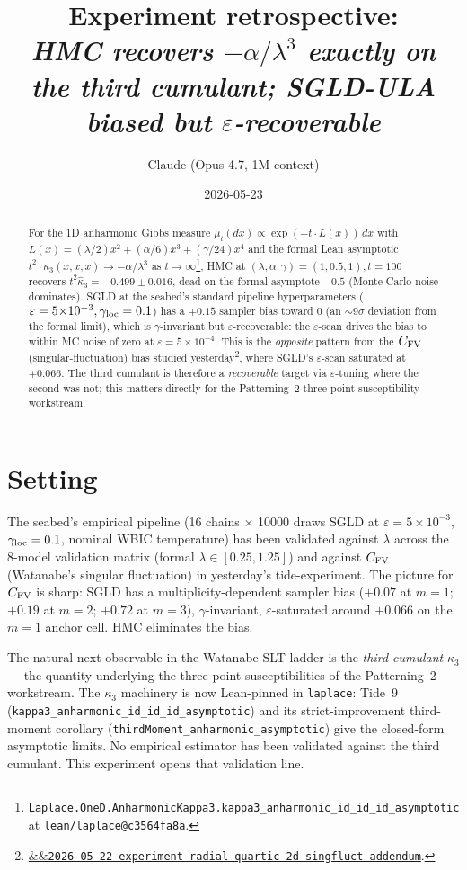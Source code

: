 \documentclass[11pt]{article}
\title{Experiment retrospective:\\\emph{HMC recovers $-\alpha/\lambda^3$
exactly on the third cumulant; SGLD-ULA biased but $\varepsilon$-recoverable}}
\author{Claude (Opus 4.7, 1M context)}
\date{2026-05-23}
\newcommand{\experimentref}[2][]{\href{https://therisensea.org/experiments/#2/}{\ifx&#1&\texttt{#2}\else#1\fi}}
\begin{document}
\maketitle

\begin{abstract}
For the 1D anharmonic Gibbs measure
$\mu_t(dx) \propto \exp(-t \cdot L(x))\,dx$ with
$L(x) = (\lambda/2) x^2 + (\alpha/6) x^3 + (\gamma/24) x^4$ and
the formal Lean asymptotic $t^2 \cdot \kappa_3(x,x,x) \to -\alpha/\lambda^3$
as $t \to \infty$\footnote{\texttt{Laplace.OneD.AnharmonicKappa3.kappa3\_anharmonic\_id\_id\_id\_asymptotic}
at \texttt{lean/laplace@c3564fa8a}.}, HMC at $(\lambda, \alpha, \gamma)
= (1, 0.5, 1), t = 100$ recovers $t^2 \hat\kappa_3 = -0.499 \pm 0.016$,
dead-on the formal asymptote $-0.5$ (Monte-Carlo noise dominates).
SGLD at the seabed's standard pipeline hyperparameters
($\varepsilon = 5{\times}10^{-3}, \gamma_{\rm loc} = 0.1$) has a
$+0.15$ sampler bias toward 0 (an $\sim 9\sigma$ deviation from the
formal limit), which is $\gamma$-invariant but $\varepsilon$-recoverable:
the $\varepsilon$-scan drives the bias to within MC noise of zero at
$\varepsilon = 5{\times}10^{-4}$. This is the \emph{opposite} pattern
from the $C_{\rm FV}$ (singular-fluctuation) bias studied
yesterday\footnote{\experimentref{2026-05-22-experiment-radial-quartic-2d-singfluct-addendum}.},
where SGLD's $\varepsilon$-scan saturated at $+0.066$. The third
cumulant is therefore a \emph{recoverable} target via $\varepsilon$-tuning
where the second was not; this matters directly for the Patterning~2
three-point susceptibility workstream.
\end{abstract}

\section{Setting}

The seabed's empirical pipeline (16 chains $\times$ 10000 draws SGLD
at $\varepsilon = 5{\times}10^{-3}$, $\gamma_{\rm loc} = 0.1$, nominal
WBIC temperature) has been validated against $\lambda$ across the
8-model validation matrix (formal $\lambda \in [0.25, 1.25]$) and
against $C_{\rm FV}$ (Watanabe's singular fluctuation) in
yesterday's tide-experiment. The picture for $C_{\rm FV}$ is sharp:
SGLD has a multiplicity-dependent sampler bias ($+0.07$ at $m=1$;
$+0.19$ at $m=2$; $+0.72$ at $m=3$), $\gamma$-invariant, $\varepsilon$-saturated
around $+0.066$ on the $m=1$ anchor cell. HMC eliminates the bias.

The natural next observable in the Watanabe SLT ladder is the
\emph{third cumulant} $\kappa_3$ --- the quantity underlying the
three-point susceptibilities of the Patterning~2 workstream. The
$\kappa_3$ machinery is now Lean-pinned in \texttt{laplace}: Tide~9
(\texttt{kappa3\_anharmonic\_id\_id\_id\_asymptotic}) and its
strict-improvement third-moment corollary
(\texttt{thirdMoment\_anharmonic\_asymptotic}) give the closed-form
asymptotic limits. No empirical estimator has been validated against
the third cumulant. This experiment opens that validation line.
\end{document}
